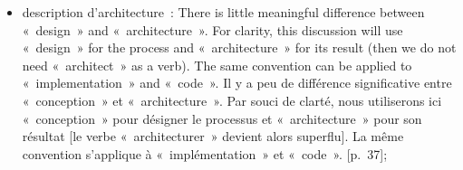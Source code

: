 {\begin{itemize}
    {[Cite Barry W. Boehm] Un ensemble de composants logiciels et système, de connexions et de contraintes. Un ensemble d'énoncés de besoins des parties prenantes du système. Une justification démontrant que les composants, les connexions et les contraintes définissent un système qui, s'il était implémenté, satisferait l'ensemble des énoncés de besoins des parties prenantes du système.}
    [p.~61];
    \item description d'architecture~:\enfr
    {There is little meaningful difference between «~design~» and «~architecture~». For clarity, this discussion will use «~design~» for the process and «~architecture~» for its result (then we do not need «~architect~» as a verb). The same convention can be applied to «~implementation~» and «~code~».}
    {Il y a peu de différence significative entre «~conception~» et «~architecture~». Par souci de clarté, nous utiliserons ici «~conception~» pour désigner le processus et «~architecture~» pour son résultat [le verbe «~architecturer~» devient alors superflu]. La même convention s’applique à «~implémentation~» et «~code~».}
    [p.~37];
\end{itemize}

}{}

